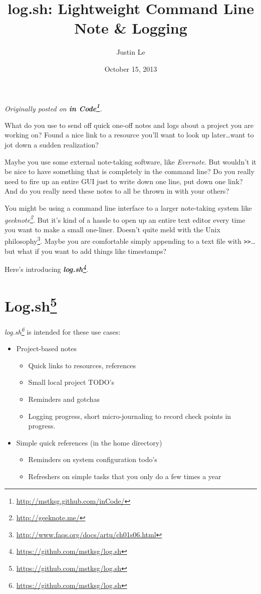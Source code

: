\documentclass[]{article}
\title{log.sh: Lightweight Command Line Note \& Logging}
\author{Justin Le}
\date{October 15, 2013}
\renewcommand{\href}[2]{#2\footnote{\url{#1}}}
\begin{document}
\maketitle

\emph{Originally posted on
\textbf{\href{http://mstksg.github.com/inCode/}{in Code}}.}

What do you use to send off quick one-off notes and logs about a project
you are working on? Found a nice link to a resource you'll want to look
up later\ldots{}want to jot down a sudden realization?

Maybe you use some external note-taking software, like \emph{Evernote}.
But wouldn't it be nice to have something that is completely in the
command line? Do you really need to fire up an entire GUI just to write
down one line, put down one link? And do you really need these notes to
all be thrown in with your others?

You might be using a command line interface to a larger note-taking
system like \emph{\href{http://geeknote.me/}{geeknote}}. But it's kind
of a hassle to open up an entire text editor every time you want to make
a small one-liner. Doesn't quite meld with the
\href{http://www.faqs.org/docs/artu/ch01s06.html}{Unix philosophy}.
Maybe you are comfortable simply appending to a text file with
\texttt{\textgreater{}\textgreater{}}\ldots{}but what if you want to add
things like timestamps?

Here's introducing
\textbf{\emph{\href{https://github.com/mstksg/log.sh}{log.sh}}}.

\section{\texorpdfstring{\href{https://github.com/mstksg/log.sh}{Log.sh}}{Log.sh}}\label{log.shlog.sh}

\emph{\href{https://github.com/mstksg/log.sh}{log.sh}} is intended for
these use cases:

\begin{itemize}
\tightlist
\item
  Project-based notes

  \begin{itemize}
  \tightlist
  \item
    Quick links to resources, references
  \item
    Small local project TODO's
  \item
    Reminders and gotchas
  \item
    Logging progress, short micro-journaling to record check points in
    progress.
  \end{itemize}
\item
  Simple quick references (in the home directory)

  \begin{itemize}
  \tightlist
  \item
    Reminders on system configuration todo's
  \item
    Refreshers on simple tasks that you only do a few times a year
  \end{itemize}
\end{itemize}
\end{document}
